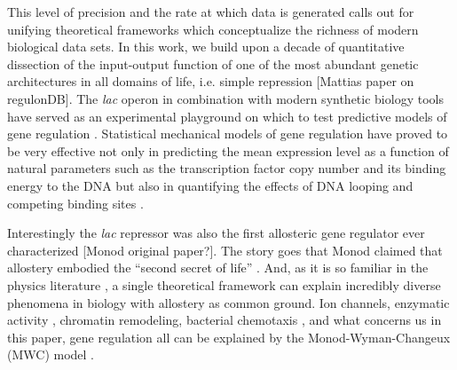 This level of precision and the rate at which data is generated calls out for
unifying theoretical frameworks which conceptualize the richness of modern
biological data sets. In this work, we build upon a decade of quantitative
dissection of the input-output function of one of the most abundant genetic
architectures in all domains of life, i.e. simple repression [Mattias paper on
regulonDB]. The \textit{lac} operon in combination with modern synthetic biology
tools have served as an experimental playground on which to test predictive
models of gene regulation . Statistical mechanical models of gene regulation have
proved to be very effective not only in predicting the mean expression level as a
function of natural parameters such as the transcription factor copy number and
its binding energy to the DNA \cite{Garcia2011} but also in quantifying the effects of DNA looping
\cite{Boedicker2013a} and competing binding sites \cite{Brewster2014} .

Interestingly the \textit{lac} repressor was also the first allosteric gene
regulator ever characterized [Monod original paper?]. The story goes that Monod
claimed  that allostery embodied the ``second secret of life'' \cite{Marzen2013}.
And, as it is so familiar in the physics literature , a single theoretical
framework can explain incredibly diverse phenomena in biology with allostery as
common ground. Ion channels, enzymatic activity \cite{Einav2016}, chromatin
remodeling, bacterial chemotaxis \cite{Endres2006}, and what concerns us in
this paper, gene regulation all can be explained by the Monod-Wyman-Changeux
(MWC) model \cite{Marzen2013}. 

